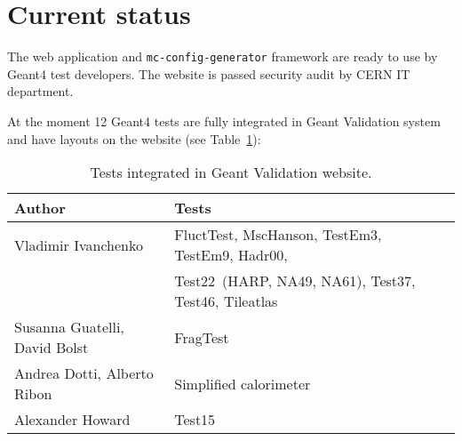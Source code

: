 \section{Current status}
\label{sec-status}

The web application and {\tt mc-config-generator} framework are ready to use by Geant4 test developers. The website is passed security audit by CERN IT department.

At the moment 12 Geant4 tests are fully integrated in Geant Validation system and have layouts on the website (see Table~\ref{table:tests}):

\begin{table}[h]
\centering
\begin{tabular}{lll}
\hline
Author & Tests  \\\hline
Vladimir Ivanchenko & FluctTest, MscHanson, TestEm3, TestEm9, Hadr00, \\ 
& Test22~(HARP, NA49, NA61), Test37, Test46, Tileatlas \\
Susanna Guatelli, David Bolst & FragTest \\
Andrea Dotti, Alberto Ribon & Simplified calorimeter \\
Alexander Howard & Test15 \\

\end{tabular}
\caption{Tests integrated in Geant Validation website.}
\label{table:tests}
\end{table}


